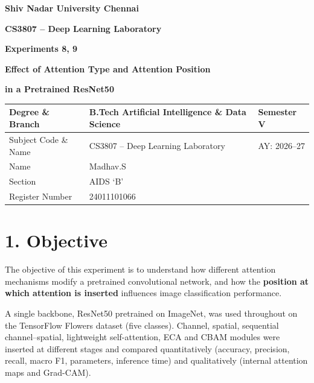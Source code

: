 \documentclass[10pt]{article}
\begin{document}

\begin{center}

{\large\textbf{Shiv Nadar University Chennai}}

\vspace{2mm}

{\normalsize\textbf{CS3807 -- Deep Learning Laboratory}}

\vspace{2mm}

{\large\textbf{Experiments 8, 9}}

\vspace{1mm}

{\normalsize\textbf{Effect of Attention Type and Attention Position}}

{\normalsize\textbf{in a Pretrained ResNet50}}

\end{center}

\vspace{3mm}

\begin{tabular}{|p{3.4cm}|p{9.0cm}|p{1.4cm}|}
\hline
Degree \& Branch &
B.Tech Artificial Intelligence \& Data Science &
Semester V\\
\hline
Subject Code \& Name &
CS3807 -- Deep Learning Laboratory &
AY: 2026--27\\
\hline
Name & Madhav.S & \\
\hline
Section & AIDS `B' & \\
\hline
Register Number & 24011101066 & \\
\hline
\end{tabular}

\section*{1. Objective}

The objective of this experiment is to understand how different attention
mechanisms modify a pretrained convolutional network, and how the
\textbf{position at which attention is inserted} influences image
classification performance.

A single backbone, ResNet50 pretrained on ImageNet, was used throughout on
the TensorFlow Flowers dataset (five classes). Channel, spatial, sequential
channel--spatial, lightweight self-attention, ECA and CBAM modules were
inserted at different stages and compared quantitatively (accuracy,
precision, recall, macro F1, parameters, inference time) and qualitatively
(internal attention maps and Grad-CAM).
\end{document}
